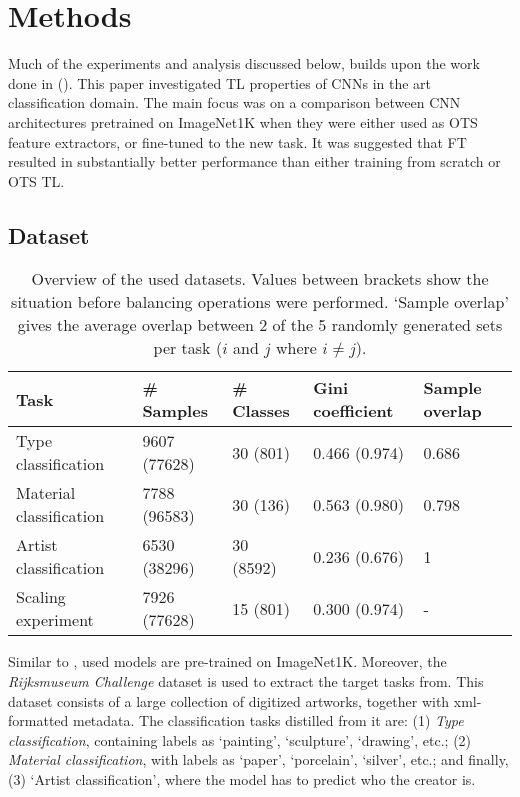\section{Methods}

Much of the experiments and analysis discussed below, builds upon the work done in \citeauthor{sabatelli2018deep} (\citeyear{sabatelli2018deep}). This paper investigated TL properties of CNNs in the art classification domain. The main focus was on a comparison between CNN architectures pretrained on ImageNet1K when they were either used as OTS feature extractors, or fine-tuned to the new task. It was suggested that FT resulted in substantially better performance than either training from scratch or OTS TL.

\subsection{Dataset} \label{methods:dataset}

\begin{table*}[tb]
\centering
\small
\begin{tabular}{lllll}
\hline
\textbf{Task} & \textbf{\# Samples} & \textbf{\# Classes} & \textbf{Gini coefficient} & \textbf{Sample overlap} \\ \hline
Type classification & 9607 (77628) & 30 (801) & 0.466 (0.974) & 0.686 \\
Material classification & 7788 (96583) & 30 (136) & 0.563 (0.980) & 0.798 \\
Artist classification & 6530 (38296) & 30 (8592) & 0.236 (0.676) & 1 \\
Scaling experiment & 7926 (77628) & 15 (801) & 0.300 (0.974) & - \\ \hline
\end{tabular}
\caption{Overview of the used datasets. Values between brackets show the situation before balancing operations were performed. `Sample overlap' gives the average overlap between 2 of the 5 randomly generated sets per task ($i$ and $j$ where $i \neq j$).}
\label{methods:datasets}
\end{table*}

Similar to \citeauthor{sabatelli2018deep}, used models are pre-trained on ImageNet1K. Moreover, the \textit{Rijksmuseum Challenge} dataset \citep{mensink14icmr} is used to extract the target tasks from. This dataset consists of a large collection of digitized artworks, together with xml-formatted metadata. The classification tasks distilled from it are: (1) \textit{Type classification}, containing labels as `painting', `sculpture', `drawing', etc.; (2) \textit{Material classification}, with labels as `paper', `porcelain', `silver', etc.; and finally, (3) `Artist classification', where the model has to predict who the creator is.

